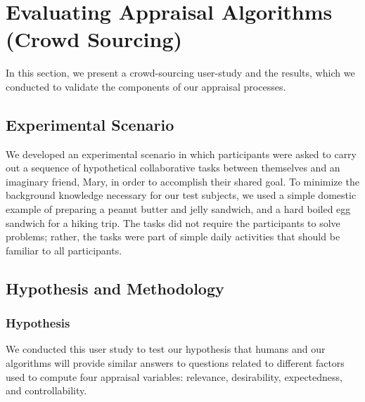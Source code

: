 \documentclass[12pt]{report}
\begin{document}
\section{Evaluating Appraisal Algorithms (Crowd Sourcing)}
\label{sec:crowd-sourcing}
In this section, we present a crowd-sourcing user-study and the results, which
we conducted to validate the components of our appraisal processes.

\subsection{Experimental Scenario}
We developed an experimental scenario in which participants were asked to
carry out a sequence of hypothetical collaborative tasks between themselves and
an imaginary friend, Mary, in order to accomplish their shared goal. To minimize
the background knowledge necessary for our test subjects, we used a simple
domestic example of preparing a peanut butter and jelly sandwich, and a hard
boiled egg sandwich for a hiking trip. The tasks did not require the
participants to solve problems; rather, the tasks were part of simple daily
activities that should be familiar to all participants. 
% 
% 

\subsection{Hypothesis and Methodology}

\subsubsection{Hypothesis}
We conducted this user study to test our hypothesis that humans and our
algorithms will provide similar answers to questions related to different
factors used to compute four appraisal variables: relevance, desirability,
expectedness, and controllability.
\end{document}
